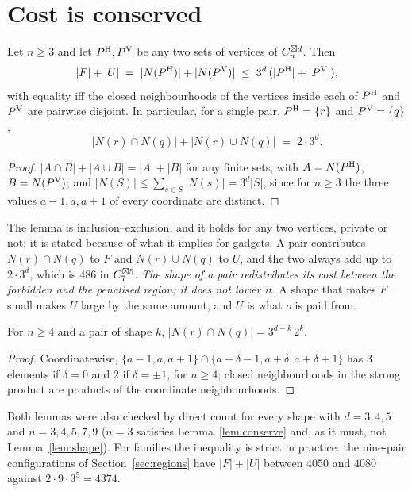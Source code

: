 \section{Cost is conserved}
\label{sec:identity}

\begin{lemma}
\label{lem:conserve}
Let $n\ge3$ and let $P^{\mathrm H},P^{\mathrm V}$ be any two sets of vertices of $C_n^{\boxtimes d}$. Then
\[
  |F|+|U| \;=\; |N(P^{\mathrm H})|+|N(P^{\mathrm V})| \;\le\; 3^d\,(|P^{\mathrm H}|+|P^{\mathrm V}|),
\]
with equality iff the closed neighbourhoods of the vertices inside each of $P^{\mathrm H}$ and $P^{\mathrm V}$ are
pairwise disjoint. In particular, for a single pair, $P^{\mathrm H}=\{r\}$ and $P^{\mathrm V}=\{q\}$,
\[
  |N(r)\cap N(q)|+|N(r)\cup N(q)| \;=\; 2\cdot 3^d .
\]
\end{lemma}

\begin{proof}
$|A\cap B|+|A\cup B|=|A|+|B|$ for any finite sets, with $A=N(P^{\mathrm H})$, $B=N(P^{\mathrm V})$; and
$|N(S)|\le\sum_{s\in S}|N(s)|=3^d|S|$, since for $n\ge3$ the three values $a-1,a,a+1$ of
every coordinate are distinct.
\end{proof}

The lemma is inclusion--exclusion, and it holds for any two vertices, private or not; it is
stated because of what it implies for gadgets. A pair contributes $N(r)\cap N(q)$ to $F$ and
$N(r)\cup N(q)$ to $U$, and the two always add up to $2\cdot 3^d$, which is $486$ in
$C_7^{\boxtimes 5}$. \emph{The shape of a pair redistributes its cost between the forbidden and the
penalised region; it does not lower it.} A shape that makes $F$ small makes $U$ large by the
same amount, and $U$ is what $o$ is paid from.

\begin{lemma}
\label{lem:shape}
For $n\ge4$ and a pair of shape $k$, $|N(r)\cap N(q)|=3^{d-k}\,2^{k}$.
\end{lemma}

\begin{proof}
Coordinatewise, $\{a-1,a,a+1\}\cap\{a+\delta-1,a+\delta,a+\delta+1\}$ has $3$ elements if
$\delta=0$ and $2$ if $\delta=\pm1$, for $n\ge4$; closed neighbourhoods in the strong product
are products of the coordinate neighbourhoods.
\end{proof}

Both lemmas were also checked by direct count for every shape with $d=3,4,5$ and
$n=3,4,5,7,9$ ($n=3$ satisfies Lemma~\ref{lem:conserve} and, as it must, not
Lemma~\ref{lem:shape}). For families the inequality is strict in practice: the nine-pair
configurations of Section~\ref{sec:regions} have $|F|+|U|$ between $4050$ and $4080$ against
$2\cdot9\cdot3^5=4374$.

